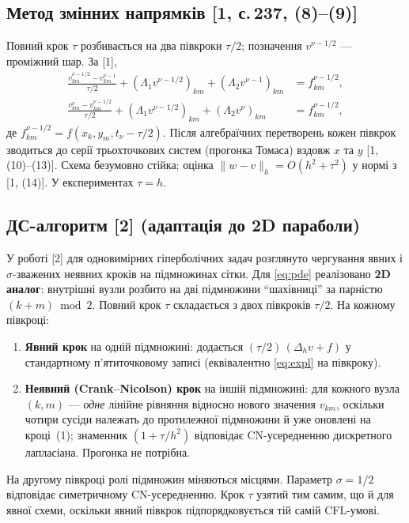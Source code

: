 \documentclass[12pt,a4paper]{article}
\newcommand{\tauh}{\tau}
\newcommand{\Lao}{\Lambda_1}
\newcommand{\Lat}{\Lambda_2}
\begin{document}
\subsection{Метод змінних напрямків  [1, с.\,237, (8)--(9)]}

Повний крок $\tauh$ розбивається на два півкроки $\tauh/2$; позначення $v^{\nu-1/2}$ --- проміжний шар. За [1],
\begin{align}
  \frac{v_{km}^{\nu-1/2} - v_{km}^{\nu-1}}{\tauh/2} + (\Lao v^{\nu-1/2})_{km} + (\Lat v^{\nu-1})_{km} &= f_{km}^{\nu-1/2},\\
  \frac{v_{km}^{\nu} - v_{km}^{\nu-1/2}}{\tauh/2} + (\Lao v^{\nu-1/2})_{km} + (\Lat v^{\nu})_{km} &= f_{km}^{\nu-1/2},
\end{align}
де $f_{km}^{\nu-1/2}=f(x_k,y_m,t_\nu-\tauh/2)$. Після алгебраїчних перетворень кожен півкрок зводиться до серії трьохточкових систем (прогонка Томаса) вздовж $x$ та $y$ [1, (10)--(13)]. Схема безумовно стійка; оцінка $\|w-v\|_h=O(h^2+\tauh^2)$ у нормі з [1, (14)]. У експериментах $\tauh=h$.

\subsection{ДС-алгоритм [2] (адаптація до 2D параболи)}

У роботі [2] для одновимірних гіперболічних задач розглянуто чергування явних і $\sigma$-зважених неявних кроків на підмножинах сітки. Для \eqref{eq:pde} реалізовано \textbf{2D аналог}: внутрішні вузли розбито на дві підмножини ``шахівниці'' за парністю $(k+m)\bmod 2$. Повний крок $\tauh$ складається з двох півкроків $\tauh/2$. На кожному півкроці:
\begin{enumerate}
  \item \textbf{Явний крок} на одній підмножині: додається $(\tauh/2)\,(\Delta_h v + f)$ у стандартному п'ятиточковому записі (еквівалентно \eqref{eq:expl} на півкроку).
  \item \textbf{Неявний (Crank--Nicolson) крок} на іншій підмножині: для кожного вузла $(k,m)$ --- \emph{одне} лінійне рівняння відносно нового значення $v_{km}$, оскільки чотири сусіди належать до протилежної підмножини й уже оновлені на кроці~(1); знаменник $(1+\tauh/h^2)$ відповідає CN-усередненню дискретного лапласіана. Прогонка не потрібна.
\end{enumerate}
На другому півкроці ролі підмножин міняються місцями. Параметр $\sigma=1/2$ відповідає симетричному CN-усередненню. Крок $\tauh$ узятий тим самим, що й для явної схеми, оскільки явний півкрок підпорядковується тій самій CFL-умові.
\end{document}
